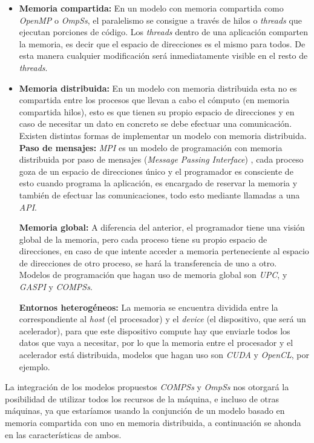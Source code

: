 \begin{itemize}
\item \textbf{Memoria compartida:} En un modelo con memoria compartida como \textit{OpenMP} o \textit{OmpSs}, el paralelismo se consigue a través de hilos o \textit{threads} que ejecutan porciones de código. Los \textit{threads} dentro de una aplicación comparten la memoria, es decir que el espacio de direcciones es el mismo para todos. De esta manera cualquier modificación será inmediatamente visible en el resto de \textit{threads}.
\item \textbf{Memoria distribuida:} En un modelo con memoria distribuida esta no es compartida entre los procesos que llevan a cabo el cómputo (en memoria compartida hilos), esto es que tienen su propio espacio de direcciones y en caso de necesitar un dato en concreto se debe efectuar una comunicación. Existen distintas formas de implementar un modelo con memoria distribuida.
		\subitem \textbf{Paso de mensajes:} \textit{MPI} es un modelo de programación con memoria distribuida por paso de mensajes (\textit{Message Passing Interface}) , cada proceso goza de un espacio de direcciones único y el programador es consciente de esto cuando programa la aplicación, es encargado de reservar la memoria y también de efectuar las comunicaciones, todo esto mediante llamadas a una \textit{API}.

		\subitem \textbf{Memoria global:} A diferencia del anterior, el programador tiene una visión global de la memoria, pero cada proceso tiene su propio espacio de direcciones, en caso de que intente acceder a memoria perteneciente al espacio de direcciones de otro proceso, se hará la transferencia de uno a otro. Modelos de programación que hagan uso de memoria global son \textit{UPC}\cite{berkupc}, y \textit{GASPI}\cite{grunewald2013gaspi} y \textit{COMPSs}\cite{badia2015comp}.
 
		\subitem \textbf{Entornos heterogéneos:} La memoria se encuentra dividida entre la correspondiente al \textit{host} (el procesador) y el \textit{device} (el dispositivo, que será un acelerador), para que este dispositivo compute hay que enviarle todos los datos que vaya a necesitar, por lo que la memoria entre el procesador y el acelerador está distribuida, modelos que hagan uso son \textit{CUDA}\cite{luebke2008cuda} y \textit{OpenCL}\cite{stone2010opencl}, por ejemplo.
\end{itemize}

\par\bigskip
La integración de los modelos propuestos \textit{COMPSs} y \textit{OmpSs} nos otorgará la posibilidad de utilizar todos los recursos de la máquina, e incluso de otras máquinas, ya que estaríamos usando la conjunción de un modelo basado en memoria compartida con uno en memoria distribuida, a continuación se ahonda en las características de ambos.

